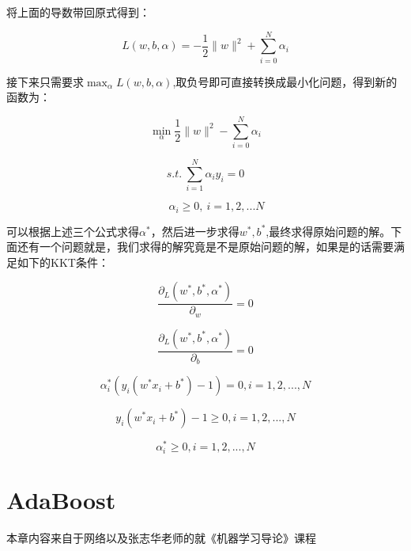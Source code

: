 	将上面的导数带回原式得到：
	
	\begin{equation}
	L(w,b,\alpha) = -\frac{1}{2}\|w\|^2 + \sum_{i=0}^{N} \alpha_i
	\end{equation}
	
	接下来只需要求$\max_{\alpha}L(w,b,\alpha)$,取负号即可直接转换成最小化问题，得到新的函数为：

    \begin{equation}
	\min_{\alpha} \frac{1}{2}\|w\|^2 - \sum_{i=0}^{N} \alpha_i
	\end{equation}
	
	\begin{equation}
	s.t.\ \sum_{i=1}^{N} \alpha_i y_i = 0
	\end{equation}
	
	\begin{equation}
	\qquad \alpha_i \geq 0, \ i=1,2,...N
	\end{equation}
	
	可以根据上述三个公式求得$\alpha^*$，然后进一步求得$w^*,b^*$,最终求得原始问题的解。下面还有一个问题就是，我们求得的解究竟是不是原始问题的解，如果是的话需要满足如下的KKT条件：
	
	\begin{equation}
		\frac{\partial_L(w^*,b^*,\alpha^*)}{\partial_w} = 0
	\end{equation}

	\begin{equation}
		\frac{\partial_L(w^*,b^*,\alpha^*)}{\partial_b} = 0
	\end{equation}
	
	\begin{equation}
		\alpha_i^*(y_i(w^*x_i+b^*)-1)=0,i=1,2,...,N
	\end{equation}
	
	\begin{equation}
		y_i(w^*x_i+b^*)-1 \geq 0,i=1,2,...,N
	\end{equation}
	
	\begin{equation}
		\alpha_i^* \geq 0,i=1,2,...,N
	\end{equation}
	
	



\section{AdaBoost}
	本章内容来自于网络以及张志华老师的就《机器学习导论》课程

